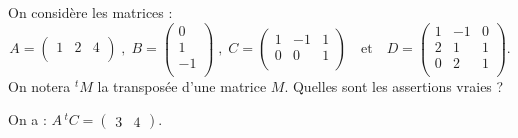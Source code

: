 \begin{question}
On considère les matrices : 
$$A=  \left(\begin{array}{rcc}1&2&4\\\end{array}\right) \; , \; 
B=    \left(\begin{array}{r}0\\1\\-1\\
\end{array}\right) \; , \;  C=\left(\begin{array}{rcc}
1&-1&1\\0&0&1\\
\end{array}\right) \quad  \mbox{et} \quad  D= \left(\begin{array}{rcc}1&-1&0\\2&1&1\\0&2&1\\
\end{array}\right).$$
On notera $^tM$ la transposée d'une matrice $M$. Quelles sont les assertions vraies ?
\begin{answers}  
\end{answers}
\begin{explanations} On a :  $A\,^tC=  
\left(\begin{array}{rc}3&4\end{array}\right).$
\end{explanations}
\end{question}

